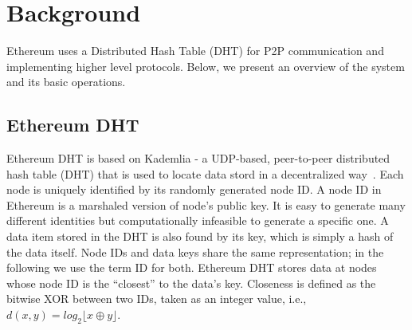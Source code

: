 
\section{Background}
\label{sec:background}




Ethereum uses a Distributed Hash Table (DHT) for P2P communication and implementing higher level protocols. Below, we present an overview of the system and its basic operations. 

\subsection{Ethereum DHT}
Ethereum DHT is based on Kademlia - a UDP-based, peer-to-peer distributed hash table (DHT) that is used to locate data stord in a decentralized way~\cite{maymounkov2002kademlia}. Each node is uniquely identified by its randomly generated node ID. A node ID in Ethereum is a marshaled version of node's public key. It is easy to generate many different identities but computationally infeasible to generate a specific one. A data item stored in the DHT is also found by its key, which is simply a hash of the data itself. Node IDs and data keys share the same representation; in the following we use the term ID for both.
Ethereum DHT stores data at nodes whose node ID is the “closest” to the data’s key. Closeness is defined as the bitwise XOR between two IDs, taken as an integer value, i.e.,$d(x, y) = \textit{log}_2 \lfloor x \oplus y \rfloor$.


